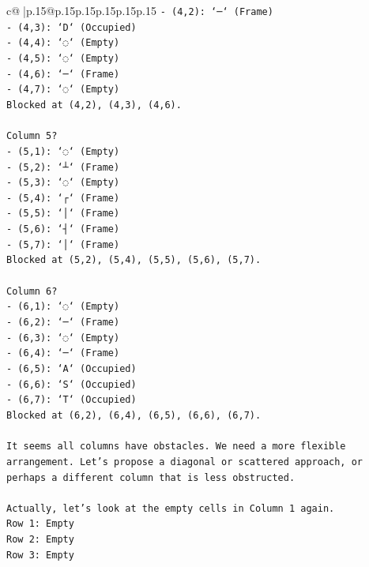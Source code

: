 \documentclass{article}
\begin{document}
{\begin{supertabular}{c@{$\;$}|p{.15\linewidth}@{}p{.15\linewidth}p{.15\linewidth}p{.15\linewidth}p{.15\linewidth}p{.15\linewidth}}
{{{\texttt{{-} (4,2): `─` (Frame)} \\
\texttt{{-} (4,3): `D` (Occupied)} \\
\texttt{{-} (4,4): `◌` (Empty)} \\
\texttt{{-} (4,5): `◌` (Empty)} \\
\texttt{{-} (4,6): `─` (Frame)} \\
\texttt{{-} (4,7): `◌` (Empty)} \\
\texttt{Blocked at (4,2), (4,3), (4,6).} \\
\\ 
\texttt{Column 5?} \\
\texttt{{-} (5,1): `◌` (Empty)} \\
\texttt{{-} (5,2): `┴` (Frame)} \\
\texttt{{-} (5,3): `◌` (Empty)} \\
\texttt{{-} (5,4): `┌` (Frame)} \\
\texttt{{-} (5,5): `│` (Frame)} \\
\texttt{{-} (5,6): `┤` (Frame)} \\
\texttt{{-} (5,7): `│` (Frame)} \\
\texttt{Blocked at (5,2), (5,4), (5,5), (5,6), (5,7).} \\
\\ 
\texttt{Column 6?} \\
\texttt{{-} (6,1): `◌` (Empty)} \\
\texttt{{-} (6,2): `─` (Frame)} \\
\texttt{{-} (6,3): `◌` (Empty)} \\
\texttt{{-} (6,4): `─` (Frame)} \\
\texttt{{-} (6,5): `A` (Occupied)} \\
\texttt{{-} (6,6): `S` (Occupied)} \\
\texttt{{-} (6,7): `T` (Occupied)} \\
\texttt{Blocked at (6,2), (6,4), (6,5), (6,6), (6,7).} \\
\\ 
\texttt{It seems all columns have obstacles. We need a more flexible arrangement. Let's propose a diagonal or scattered approach, or perhaps a different column that is less obstructed.} \\
\\ 
\texttt{Actually, let's look at the empty cells in Column 1 again.} \\
\texttt{Row 1: Empty} \\
\texttt{Row 2: Empty} \\
\texttt{Row 3: Empty} \\
}}}
\end{supertabular}}
\end{document}

